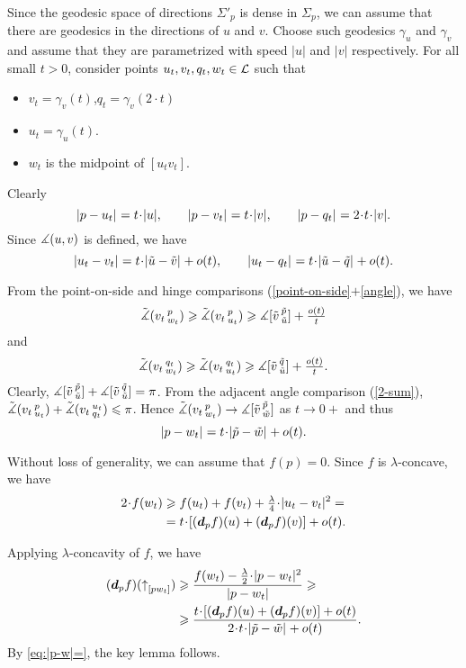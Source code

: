 Since the geodesic space of directions $\Sigma'_p$ is dense in $\Sigma_p$,
we can assume that there are geodesics in the directions of $u$ and $v$.
Choose such geodesics $\gamma_u$ and $\gamma_v$ and assume that they are parametrized with speed $|u|$ and $|v|$ respectively.
For all small $t>0$, consider points $u_t,v_t,q_t,w_t\in \mathcal{L}$ such that
\begin{itemize}
\item $v_t=\gamma_v(t)$,\quad  $q_t=\gamma_v(2\cdot t)$
\item $u_t=\gamma_u(t)$.
\item $w_t$ is the midpoint of $[u_t v_t]$.
\end{itemize}
Clearly 
\[\dist{p}{u_t}{}=t\cdot |u|,\qquad \dist{p}{v_t}{}=t\cdot|v|,\qquad \dist{p}{q_t}{}=2\cdot t\cdot|v|.\] 
Since $\measuredangle(u,v)$ is defined, 
we have 
\[\dist{u_t}{v_t}{}=t\cdot\dist{\tilde u}{\tilde v}{}+o(t),
\qquad
\dist{u_t}{q_t}{}=t\cdot\dist{\tilde u}{\tilde q}{}+o(t).\]

From the point-on-side and hinge comparisons (\ref{point-on-side}$+$\ref{angle}), we have
\[\tilde\measuredangle(v_t\,{}^{p}_{w_t})
\geqslant
\tilde\measuredangle(v_t\,{}^{p}_{u_t})
\geqslant
\measuredangle[\tilde v\,{}^{\tilde p}_{\tilde u}]+\tfrac{o(t)}t\]
and
\[\tilde\measuredangle(v_t\,{}^{q_t}_{w_t})
\geqslant
\tilde\measuredangle(v_t\,{}^{q_t}_{u_t})
\geqslant
\measuredangle[\tilde v\,{}^{\tilde q}_{\tilde u}]+\tfrac{o(t)}t.\]
Clearly, 
$\measuredangle[\tilde v\,{}^{\tilde p}_{\tilde u}]+\measuredangle[\tilde v\,{}^{\tilde q}_{\tilde u}]=\pi$. 
From the adjacent angle comparison (\ref{2-sum}), 
$\angk{v_t}p{u_t}\z+\angk{v_t}{u_t}{q_t}\le \pi$.
Hence
$\tilde\measuredangle(v_t\,{}^{p}_{w_t})
\to
\measuredangle[\tilde v\,{}^{\tilde p}_{\tilde w}]$ as $t\to0+$
and thus 
\[\dist{p}{w_t}{}=t\cdot\dist{\tilde p}{\tilde w}{}+o(t).\]

Without loss of generality, we can assume that $f(p)=0$.
Since $f$ is $\lambda$-concave, we have 
\begin{align*}
2\cdot f(w_t)&\ge f(u_t)+f(v_t)+\tfrac\lambda4\cdot\dist[2]{u_t}{v_t}{}=
\\
&=t\cdot [(\dd_p f)(u)+(\dd_p f)(v)]+o(t).
\end{align*}
 
Applying $\lambda$-concavity of $f$, we have
\begin{align*}
(\dd_p f)(\dir p{w_t})
&\ge 
\frac{f(w_t)-\tfrac\lambda2\cdot |p-w_t|^2}{|p-w_t|}
\ge 
\\
&\ge
\frac{t\cdot[(\dd_p f)(u)+(\dd_p f)(v)]
+o(t)}{2\cdot t\cdot\dist[{{}}]{\tilde p}{\tilde w}{}+o(t)}.
\end{align*}
By \ref{eq:|p-w|=}, the key lemma follows.
\qeds

